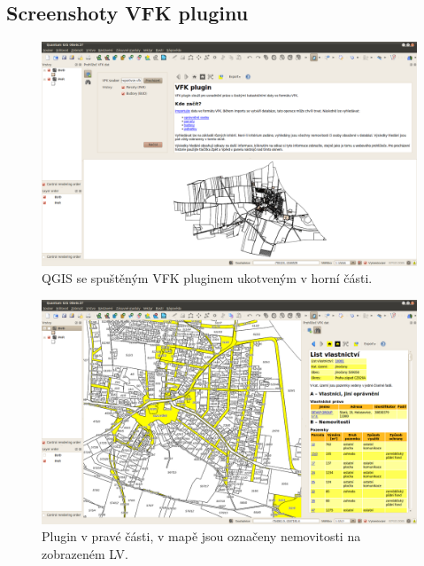 \documentclass[a4paper,12pt]{article}
\begin{document}
\subsection{Screenshoty VFK pluginu}
\begin{figure}[h!]
\centering
\includegraphics[width=\textwidth]{./screenshoty/Quantum_GIS_08e6c37_028.png}
\caption{QGIS se spuštěným VFK pluginem ukotveným v horní části.}
\label{fig:screenshot1}
\end{figure}

\begin{figure}[h!]
\centering
\includegraphics[width=\textwidth]{./screenshoty/Quantum_GIS_08e6c37_033.png}
\caption{Plugin v pravé části, v mapě jsou označeny nemovitosti na zobrazeném LV.}
\label{fig:screenshot2}
\end{figure}
\end{document}
